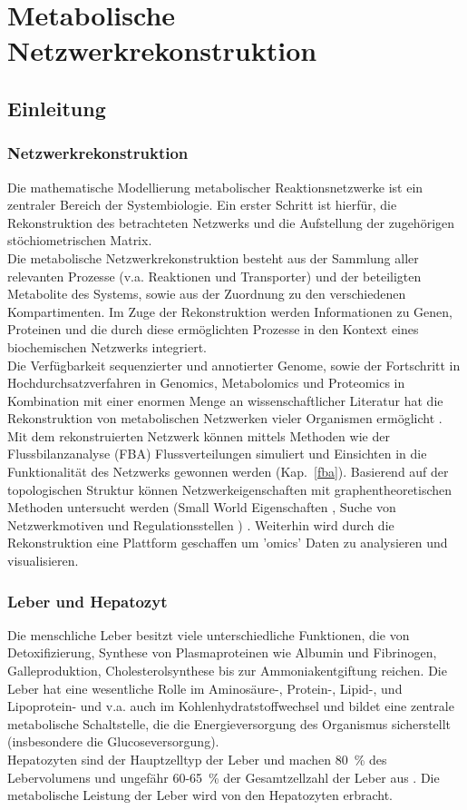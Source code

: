 \chapter{Metabolische Netzwerkrekonstruktion}
\label{reconstruction}
\section{Einleitung}
\subsection{Netzwerkrekonstruktion}
Die mathematische Modellierung metabolischer Reaktionsnetzwerke ist ein zentraler Bereich der Systembiologie. Ein erster Schritt ist hierfür, die Rekonstruktion des betrachteten Netzwerks und die Aufstellung der zugehörigen stöchiometrischen Matrix.\\
Die metabolische Netzwerkrekonstruktion besteht aus der Sammlung aller relevanten Prozesse (v.a. Reaktionen und Transporter) und der beteiligten Metabolite des Systems, sowie aus der Zuordnung zu den verschiedenen Kompartimenten. Im Zuge der Rekonstruktion werden Informationen zu Genen, Proteinen und die durch diese ermöglichten Prozesse in den Kontext eines biochemischen Netzwerks integriert.\\
Die Verfügbarkeit sequenzierter und annotierter Genome, sowie der Fortschritt in Hochdurchsatzverfahren in Genomics, Metabolomics und Proteomics in Kombination mit einer enormen Menge an wissenschaftlicher Literatur hat die Rekonstruktion von metabolischen Netzwerken vieler Organismen ermöglicht \cite{Boelling2009, Duarte2004, Heinemann2005, Feist2007}.\\
Mit dem rekonstruierten Netzwerk können mittels Methoden wie der Flussbilanzanalyse (FBA) Flussverteilungen simuliert und Einsichten in die Funktionalität des Netzwerks gewonnen werden \cite{Francke2005} (Kap.~\ref{fba}). Basierend auf der topologischen Struktur können Netzwerkeigenschaften mit graphentheoretischen Methoden untersucht werden (Small World Eigenschaften \cite{Albert2005, Khanin2006},  Suche von Netzwerkmotiven und Regulationsstellen \cite{Stelling2002})
\cite{Lacroix2008}. Weiterhin wird durch die Rekonstruktion eine Plattform geschaffen um 'omics' Daten zu analysieren und visualisieren.

\subsection{Leber und Hepatozyt}
Die menschliche Leber besitzt viele unterschiedliche Funktionen, die von Detoxifizierung, Synthese von Plasmaproteinen wie Albumin und Fibrinogen, Galleproduktion, Cholesterolsynthese bis zur Ammoniakentgiftung reichen. Die Leber hat eine wesentliche Rolle im Aminosäure-, Protein-, Lipid-, und Lipoprotein- und v.a. auch im Kohlenhydratstoffwechsel \cite{Kuntz2006} und bildet eine zentrale metabolische Schaltstelle, die die Energieversorgung des Organismus sicherstellt (insbesondere die Glucoseversorgung).\\
Hepatozyten sind der Hauptzelltyp der Leber und machen 80~\% des Lebervolumens und ungefähr 60-65~\% der Gesamtzellzahl der Leber aus \cite{Kuntz2006}. Die metabolische Leistung der Leber wird von den Hepatozyten erbracht.

